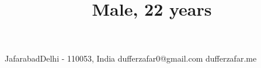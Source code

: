\title{\normalsize Male, 22 years}

\address
    {H.No. 139, Street No. 7}{Jafarabad}{Delhi - 110053, India}
\email
    {dufferzafar0@gmail.com}
\homepage
    {dufferzafar.me}
